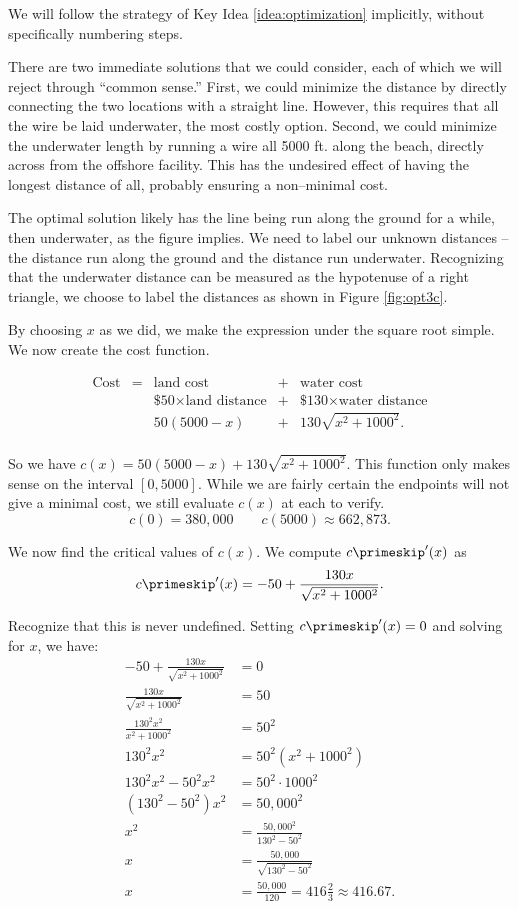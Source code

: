 {We will follow the strategy of Key Idea \ref{idea:optimization} implicitly, without specifically numbering steps.

There are two immediate solutions that we could consider, each of which we will reject through ``common sense.'' First, we could minimize the distance by directly connecting the two locations with a straight line. However, this requires that all the wire be laid underwater, the most costly option. Second, we could minimize the underwater length by running a wire all 5000 ft. along the beach, directly across from the offshore facility. This has the undesired effect of having the longest distance of all, probably ensuring a non--minimal cost.

The optimal solution likely has the line being run along the ground for a while, then underwater, as the figure implies. We need to label our unknown distances -- the distance run along the ground and the distance run underwater. Recognizing that the underwater distance can be measured as the hypotenuse of a right triangle, we choose to label the distances as shown in Figure \ref{fig:opt3c}.


By choosing $x$ as we did, we make the expression under the square root simple. We now create the cost function. 

$$
\begin{array}{ccccc}
\text{Cost} &=&  \text{land cost} &+ & \text{water cost} \\
						&	& \text{\$50}\times \text{land distance} &+& \text{\$130}\times \text{water distance} \\
						&	& 50(5000-x) &+& 130\sqrt{x^2+1000^2}.\\
\end{array}
$$

So we have $c(x) = 50(5000-x)+ 130\sqrt{x^2+1000^2}$. This function only makes sense on the interval $[0,5000]$. While we are fairly certain the endpoints will not give a minimal cost, we still evaluate $c(x)$ at each to verify.
$$c(0) = 380,000 \quad\quad c(5000) \approx 662,873.$$

We now find the critical values of $c(x)$. We compute $c\primeskip'(x)$ as 
$$c\primeskip'(x) = -50+\frac{130x}{\sqrt{x^2+1000^2}}.$$

Recognize that this is never undefined. Setting $c\primeskip'(x)=0$ and solving for $x$, we have:
\begin{align*}
-50+\frac{130x}{\sqrt{x^2+1000^2}} &= 0 \\
\frac{130x}{\sqrt{x^2+1000^2}}  &= 50\\
\frac{130^2x^2}{x^2+1000^2} &= 50^2\\
130^2x^2 &= 50^2(x^2+1000^2) \\
130^2x^2-50^2x^2 &= 50^2\cdot1000^2\\
(130^2-50^2)x^2 &= 50,000^2\\
x^2 &= \frac{50,000^2}{130^2-50^2}\\
x &= \frac{50,000}{\sqrt{130^2-50^2}}\\
x & = \frac{50,000}{120} =416\frac23\approx 416.67.
\end{align*}

}
